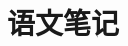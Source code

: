 ﻿\renewcommand{\hatabstractname}{\BB}





\title{语文笔记}
\author{\BE}
\date{\BF}


\maketitle
\begin{hatabstract}
\BC
\end{hatabstract}





 